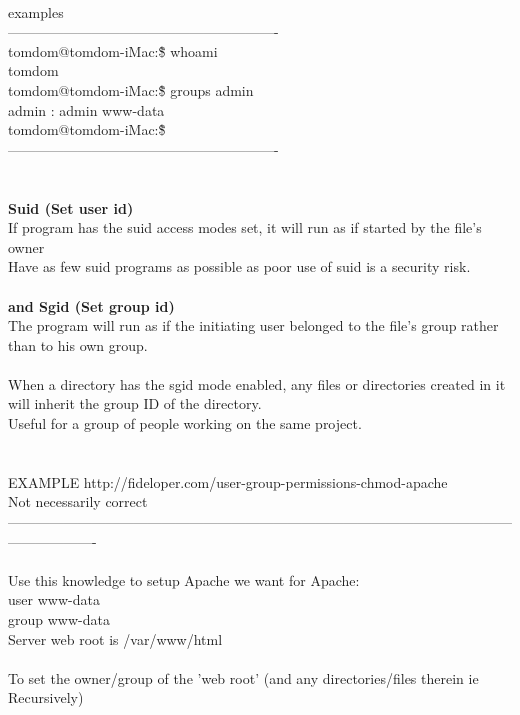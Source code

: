 \documentclass[10pt,a4paper]{article}
\begin{document}
{{{{{{{{{{{{{{{{{{{{\\
examples\\
----------------------------------------------------------\\
tomdom@tomdom-iMac:\~\$ whoami\\
tomdom\\
tomdom@tomdom-iMac:\~\$ groups admin\\
admin : admin www-data\\
tomdom@tomdom-iMac:\~\$ \\
----------------------------------------------------------\\
\\
\\
\textbf{Suid (Set user id) \\
}}{\large If program has the suid access modes set, it will run as if  started by the file's owner\\
Have as few suid programs as possible as poor use of suid is a security risk.\\
\textbf{\\
and Sgid (Set group id)}}{\large \\
The program will run as if the initiating user belonged to the file's group rather than to his own group.\\
\\
When a directory has the sgid mode enabled, any files or directories created in it will inherit the group ID of the directory. \\
Useful for a group of people working on the same project. \\
\\
\\
EXAMPLE  http://fideloper.com/user-group-permissions-chmod-apache}{\large \\
Not necessarily correct\\
-------------------------------------------------------------------------------------------------------------------------------\\
\\
Use this knowledge to setup Apache we want for Apache:\\
user www-data\\
group www-data\\
Server web root is /var/www/html}{\large \\
\\
To set the owner/group of the 'web root' (and any directories/files therein ie Recursively)\\
\\
}}}}}}}}}}}}}}}}}}}}
\end{document}
